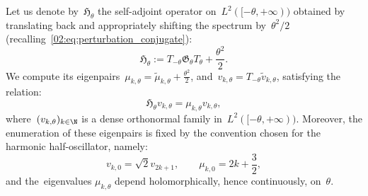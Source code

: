     Let us denote by~$\mathfrak{H}_\theta$ the self-adjoint operator on~$L^2([-\theta,+\infty))$ obtained by translating back and appropriately shifting the spectrum by~$\theta^2/2$ (recalling~\eqref{02:eq:perturbation_conjugate}):
    $$\mathfrak{H}_\theta := T_{-\theta}{\mathfrak{G}}_\theta T_\theta + \frac{\theta^2}2.$$
    We compute its eigenpairs~$\mu_{k,\theta} = \widetilde{\mu}_{k,\theta}+\frac{\theta^2}2$, and~$v_{k,\theta} = T_{-\theta}\widetilde{v}_{k,\theta}$, satisfying the relation:
    \begin{equation}
        \label{02:eq:holomorphic_eigensytem}
        {\mathfrak{H}}_\theta v_{k,\theta} = \mu_{k,\theta} v_{k,\theta},
    \end{equation}
    where~$(v_{k,\theta})_{k\in \N}$ is a dense orthonormal family in~$L^2([-\theta,+\infty))$. Moreover, the enumeration of these eigenpairs is fixed by the convention chosen for the harmonic half-oscillator, namely:
    \[v_{k,0} = \sqrt 2 v_{2k+1},\qquad \mu_{k,0} = 2k + \frac32,\]
    and the~eigenvalues $\mu_{k,\theta}$ depend holomorphically, hence continuously, on~$\theta$.

